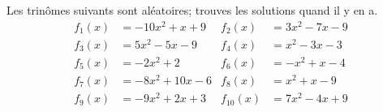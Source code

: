 

  \begin{exercice}\label{exo202}
  Les trinômes suivants sont aléatoires; trouves les solutions quand il y en a. \begin{align*}
f_{1}(x)&=-10x^2+x+9&f_{2}(x)&=3x^2-7x-9\\
f_{3}(x)&=5x^2-5x-9&f_{4}(x)&=x^2-3x-3\\
f_{5}(x)&=-2x^2+2&f_{6}(x)&=-x^2+x-4\\
f_{7}(x)&=-8x^2+10x-6&f_{8}(x)&=x^2+x-9\\
f_{9}(x)&=-9x^2+2x+3&f_{10}(x)&=7x^2-4x+9
\end{align*}
\end{exercice}
